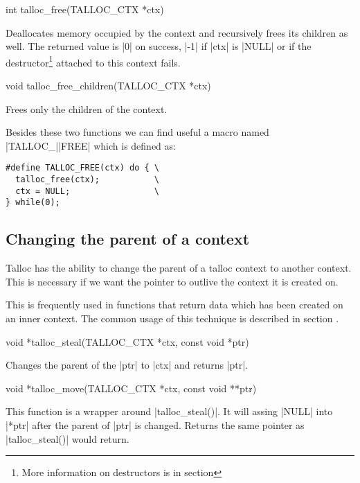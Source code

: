 \begin{funcproto}
int talloc_free(TALLOC_CTX *ctx)
\end{funcproto}
\begin{funcdesc}
  Deallocates memory occupied by the context and recursively frees its 
  children as well. The returned value is |0| on success, |-1| if |ctx| is
  |NULL| or if the destructor\footnote{More information on destructors is in
  section } attached to this context fails.
\end{funcdesc}
\begin{funcproto}
void talloc_free_children(TALLOC_CTX *ctx)
\end{funcproto}
\begin{funcdesc}
  Frees only the children of the context.
\end{funcdesc}
\funclistend
Besides these two functions we can find useful a macro named |TALLOC_||FREE|
which is defined as:

\begin{lstlisting}[caption={TALLOC_FREE(ctx)},label=lst:TALLOC_FREE]
#define TALLOC_FREE(ctx) do { \
  talloc_free(ctx);           \
  ctx = NULL;                 \
} while(0);
\end{lstlisting}



\subsection{Changing the parent of a context}
\label{talloc:subsec:stealing}

Talloc has the ability to change the parent of a talloc context to another
context. This is necessary if we want the pointer to outlive the context it is
created on.

This is frequently used in functions that return data which has been created on
an inner context. The common usage of this technique is described in section
.

\begin{funcproto}
void *talloc_steal(TALLOC_CTX *ctx, const void *ptr)
\end{funcproto}
\begin{funcdesc}
  Changes the parent of the |ptr| to |ctx| and returns |ptr|.
\end{funcdesc}
\begin{funcproto}
void *talloc_move(TALLOC_CTX *ctx, const void **ptr)
\end{funcproto}
\begin{funcdesc}
  This function is a wrapper around |talloc_steal()|. It will assing |NULL| into
  |*ptr| after the parent of |ptr| is changed. Returns the same pointer as
  |talloc_steal()| would return.
\end{funcdesc}

